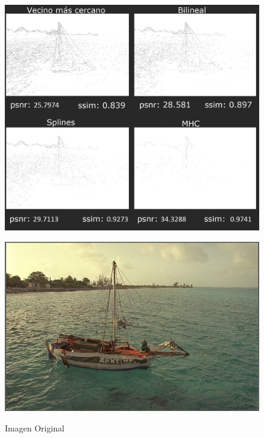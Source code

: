 \documentclass[a4paper]{article}
\begin{document}
\begin{figure}[h!]
    \caption{}
    \begin{center}
    \includegraphics[scale=0.40]{imagenes/comparacion/02/collage}
    \label{imagen2}
  \end{center}
\end{figure}


\newpage

\begin{figure}[h!]
    \caption{Imagen Original}
    \begin{center}
    \includegraphics[scale=0.15]{imagenes/comparacion/02/img2}
    \label{imgOri2}
  \end{center}
\end{figure}
\end{document}
